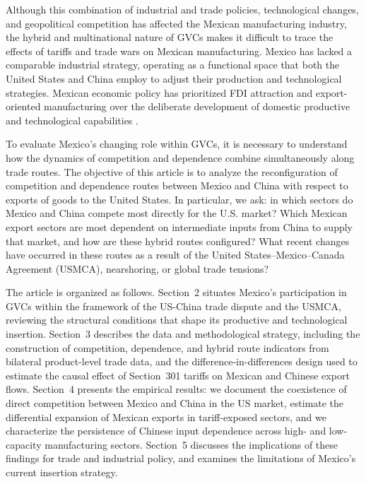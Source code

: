 \documentclass[11pt]{article}
\begin{document}
Although this combination of industrial and trade policies, technological changes, and geopolitical competition has affected the Mexican manufacturing industry, the hybrid and multinational nature of GVCs makes it difficult to trace the effects of tariffs and trade wars on Mexican manufacturing. Mexico has lacked a comparable industrial strategy, operating as a functional space that both the United States and China employ to adjust their production and technological strategies. Mexican economic policy has prioritized FDI attraction and export-oriented manufacturing over the deliberate development of domestic productive and technological capabilities \citep{Gereffi2025}.

To evaluate Mexico's changing role within GVCs, it is necessary to understand how the dynamics of competition and dependence combine simultaneously along trade routes. The objective of this article is to analyze the reconfiguration of competition and dependence routes between Mexico and China with respect to exports of goods to the United States. In particular, we ask: in which sectors do Mexico and China compete most directly for the U.S. market? Which Mexican export sectors are most dependent on intermediate inputs from China to supply that market, and how are these hybrid routes configured? What recent changes have occurred in these routes as a result of the United States--Mexico--Canada Agreement (USMCA), nearshoring, or global trade tensions?

The article is organized as follows. Section~2 situates Mexico's participation in GVCs within the framework of the US-China trade dispute and the USMCA, reviewing the structural conditions that shape its productive and technological insertion. Section~3 describes the data and methodological strategy, including the construction of competition, dependence, and hybrid route indicators from bilateral product-level trade data, and the difference-in-differences design used to estimate the causal effect of Section~301 tariffs on Mexican and Chinese export flows. Section~4 presents the empirical results: we document the coexistence of direct competition between Mexico and China in the US market, estimate the differential expansion of Mexican exports in tariff-exposed sectors, and we characterize the persistence of Chinese input dependence across high- and low-capacity manufacturing sectors. Section~5 discusses the implications of these findings for trade and industrial policy, and examines the limitations of Mexico's current insertion strategy.
\end{document}
